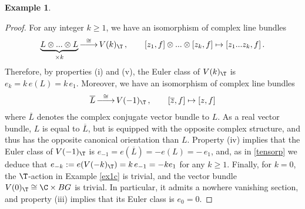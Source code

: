 \documentclass[11pt,a4paper,reqno]{article}
\DeclareMathOperator*{\ttoup}{\llongrightarrow}
\DeclareRobustCommand{\llongrightarrow}{\relbar\joinrel\relbar\joinrel\rightarrow}
\numberwithin{equation}{section}
\theoremstyle{definition}
\newtheorem{example}[theorem]{Example}
\begin{document}
\begin{example}
\begin{proof}
For any integer $k\geq 1$, we have an isomorphism of complex line bundles
\begin{equation}\label{tensorp}
\underbrace{L\otimes...\otimes L}_{\times k} \ttoup^{\cong} V(k)_{\T} \, ,
\qquad
[z_1,f]\otimes...\otimes [z_k,f]\mapsto [z_1...z_k,f] \, . 
\end{equation}
Therefore, by properties (i) and (v), the Euler class of $V(k)_\T$ is
$ 
e_k =k\,e(L)=k\,e_1 $. 
Moreover, we have an isomorphism of complex line bundles
\begin{align*}
\overline L \ttoup^{\cong} V(-1)_{\T} \, ,
\qquad
[\overline{z},f]\mapsto [z,f] 
\end{align*}
where $\overline{L}$ denotes the complex conjugate vector bundle to $L$. As a real vector bundle, $L$ is equal to $\overline L$, but is equipped with the opposite complex structure, and thus has the opposite canonical orientation than $L$. Property (iv) implies that the Euler class of $V(-1)_\T$ is 
$ e_{-1}=e(\overline L)=-e(L)=- \,e_1 $, and, 
as in \eqref{tensorp} we deduce that $ e_{-k}
:= e(V(-k)_\T ) = k\, 
e_{-1} = - k e_1 $ for any $k \geq 1 $.
Finally, for $k=0$, 
the $ \T $-action in Example 
\ref{ex1c} is trivial, and 
the vector bundle $ V(0)_\T\cong \C\times BG$ is trivial. In particular, it admits a nowhere vanishing section, and property (iii) implies that its Euler class is $ e_0 = 0 $.
\end{proof}
\end{example}
\end{document}
